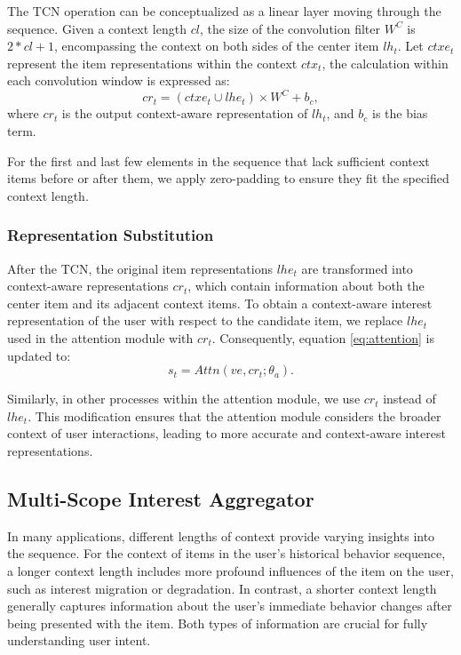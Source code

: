 The TCN operation can be conceptualized as a linear layer moving through the sequence. Given a context length $cl$, the size of the convolution filter $W^C$ is $2*cl + 1$, encompassing the context on both sides of the center item $lh_{t}$. Let $ctxe_t$ represent the item representations within the context $ctx_t$, the calculation within each convolution window is expressed as:
\begin{equation} 
    cr_t = (ctxe_t \cup lhe_t) \times W^C + b_c,
\label{eq:conv}
\end{equation}
where $cr_t$ is the output context-aware representation of $lh_{t}$, and $b_c$ is the bias term. 

For the first and last few elements in the sequence that lack sufficient context items before or after them, we apply zero-padding to ensure they fit the specified context length. 

\subsubsection{Representation Substitution}

After the TCN, the original item representations $lhe_t$ are transformed into context-aware representations $cr_t$, which contain information about both the center item and its adjacent context items. To obtain a context-aware interest representation of the user with respect to the candidate item, we replace $lhe_t$ used in the attention module with $cr_t$. Consequently, equation \ref{eq:attention} is updated to:
\begin{equation} 
    s_t = Attn(ve, cr_t;\theta_a).
\label{eq:attention_c}
\end{equation}

Similarly, in other processes within the attention module, we use $cr_t$ instead of $lhe_t$. This modification ensures that the attention module considers the broader context of user interactions, leading to more accurate and context-aware interest representations. 

\subsection{Multi-Scope Interest Aggregator}

In many applications, different lengths of context provide varying insights into the sequence. For the context of items in the user's historical behavior sequence, a longer context length includes more profound influences of the item on the user, such as interest migration or degradation. In contrast, a shorter context length generally captures information about the user's immediate behavior changes after being presented with the item. Both types of information are crucial for fully understanding user intent. 

